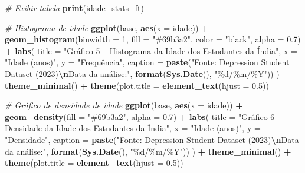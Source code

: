 \documentclass[
]{article}
\newenvironment{Shaded}{\begin{snugshade}}{\end{snugshade}}
\newcommand{\AttributeTok}[1]{\textcolor[rgb]{0.13,0.29,0.53}{#1}}
\newcommand{\CommentTok}[1]{\textcolor[rgb]{0.56,0.35,0.01}{\textit{#1}}}
\newcommand{\DecValTok}[1]{\textcolor[rgb]{0.00,0.00,0.81}{#1}}
\newcommand{\FloatTok}[1]{\textcolor[rgb]{0.00,0.00,0.81}{#1}}
\newcommand{\FunctionTok}[1]{\textcolor[rgb]{0.13,0.29,0.53}{\textbf{#1}}}
\newcommand{\NormalTok}[1]{#1}
\newcommand{\SpecialCharTok}[1]{\textcolor[rgb]{0.81,0.36,0.00}{\textbf{#1}}}
\newcommand{\StringTok}[1]{\textcolor[rgb]{0.31,0.60,0.02}{#1}}
\begin{document}
\begin{Shaded}
\begin{Highlighting}[]
\CommentTok{\# Exibir tabela}
\FunctionTok{print}\NormalTok{(idade\_stats\_ft)}

\CommentTok{\# Histograma de idade}
\FunctionTok{ggplot}\NormalTok{(base, }\FunctionTok{aes}\NormalTok{(}\AttributeTok{x =}\NormalTok{ idade)) }\SpecialCharTok{+}
  \FunctionTok{geom\_histogram}\NormalTok{(}\AttributeTok{binwidth =} \DecValTok{1}\NormalTok{, }\AttributeTok{fill =} \StringTok{"\#69b3a2"}\NormalTok{, }\AttributeTok{color =} \StringTok{"black"}\NormalTok{, }\AttributeTok{alpha =} \FloatTok{0.7}\NormalTok{) }\SpecialCharTok{+}
  \FunctionTok{labs}\NormalTok{(}
    \AttributeTok{title =} \StringTok{"Gráfico 5 – Histograma da Idade dos Estudantes da Índia"}\NormalTok{,}
    \AttributeTok{x =} \StringTok{"Idade (anos)"}\NormalTok{,}
    \AttributeTok{y =} \StringTok{"Frequência"}\NormalTok{,}
    \AttributeTok{caption =} \FunctionTok{paste}\NormalTok{(}\StringTok{"Fonte: Depression Student Dataset (2023)}\SpecialCharTok{\textbackslash{}n}\StringTok{Data da análise:"}\NormalTok{, }\FunctionTok{format}\NormalTok{(}\FunctionTok{Sys.Date}\NormalTok{(), }\StringTok{"\%d/\%m/\%Y"}\NormalTok{))}
\NormalTok{  ) }\SpecialCharTok{+}
  \FunctionTok{theme\_minimal}\NormalTok{() }\SpecialCharTok{+}
  \FunctionTok{theme}\NormalTok{(}\AttributeTok{plot.title =} \FunctionTok{element\_text}\NormalTok{(}\AttributeTok{hjust =} \FloatTok{0.5}\NormalTok{))}

\CommentTok{\# Gráfico de densidade de idade}
\FunctionTok{ggplot}\NormalTok{(base, }\FunctionTok{aes}\NormalTok{(}\AttributeTok{x =}\NormalTok{ idade)) }\SpecialCharTok{+}
  \FunctionTok{geom\_density}\NormalTok{(}\AttributeTok{fill =} \StringTok{"\#69b3a2"}\NormalTok{, }\AttributeTok{alpha =} \FloatTok{0.7}\NormalTok{) }\SpecialCharTok{+}
  \FunctionTok{labs}\NormalTok{(}
    \AttributeTok{title =} \StringTok{"Gráfico 6 – Densidade da Idade dos Estudantes da Índia"}\NormalTok{,}
    \AttributeTok{x =} \StringTok{"Idade (anos)"}\NormalTok{,}
    \AttributeTok{y =} \StringTok{"Densidade"}\NormalTok{,}
    \AttributeTok{caption =} \FunctionTok{paste}\NormalTok{(}\StringTok{"Fonte: Depression Student Dataset (2023)}\SpecialCharTok{\textbackslash{}n}\StringTok{Data da análise:"}\NormalTok{, }\FunctionTok{format}\NormalTok{(}\FunctionTok{Sys.Date}\NormalTok{(), }\StringTok{"\%d/\%m/\%Y"}\NormalTok{))}
\NormalTok{  ) }\SpecialCharTok{+}
  \FunctionTok{theme\_minimal}\NormalTok{() }\SpecialCharTok{+}
  \FunctionTok{theme}\NormalTok{(}\AttributeTok{plot.title =} \FunctionTok{element\_text}\NormalTok{(}\AttributeTok{hjust =} \FloatTok{0.5}\NormalTok{))}


\end{Highlighting}
\end{Shaded}
\end{document}
